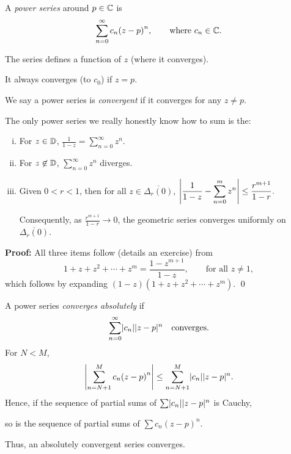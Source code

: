 \documentclass[10pt,aspectratio=169]{beamer}
\begin{document}
\begin{frame}
A \emph{power series} around $p \in {\mathbb{C}}$ is
\[
\sum_{n=0}^\infty c_n {(z-p)}^n ,
\qquad \text{where } c_n \in {\mathbb{C}}.
\]
\pause

The series defines a function of $z$ (where it converges).

\medskip
\pause

It always converges (to $c_0$) if $z=p$.

\medskip
\pause

We say a power series is \emph{convergent} if
it converges for any $z \not= p$.
\end{frame}

\begin{frame}
The only power series we really honestly know how to sum is the:

\begin{proposition}
\pause
\begin{enumerate}[(i)]
\item For $z \in {\mathbb{D}}$,
\quad
$\displaystyle
\frac{1}{1-z} = \sum_{n=0}^\infty z^n .
$
\pause
\item For $z \not\in {\mathbb{D}}$,
\quad
$\displaystyle
\sum_{n=0}^\infty z^n
$
diverges.
\pause
\item
Given $0 < r < 1$, then for all $z \in \overline{\Delta_r(0)}$,
\quad
$\displaystyle
\left\lvert {\frac{1}{1-z} - \sum_{n=0}^m z^n} \right\rvert
\leq \frac{r^{m+1}}{1-r} .
$
\pause

Consequently,
as $\frac{r^{m+1}}{1-r} \to 0$,
the geometric series converges uniformly
on $\overline{\Delta_r(0)}$.
\end{enumerate}
\end{proposition}

\pause
\textbf{Proof:}
All three items follow (details an exercise) from
\[
1+z+z^2+\cdots+z^m = \frac{1-z^{m+1}}{1-z} ,
\qquad \text{for all } z \not= 1,
\]
\pause
which follows by expanding $(1-z)(1+z+z^2+\cdots+z^m)$.
\qed
\end{frame}

\begin{frame}
A power series \emph{converges absolutely} if
\[
\sum_{n=0}^\infty \lvert {c_n} \rvert \lvert {z-p} \rvert^n \quad \text{converges.}
\]
\pause
For $N < M$,
\[
\left\lvert {\sum_{n=N+1}^M c_n {(z-p)}^n} \right\rvert
\leq
\sum_{n=N+1}^M \lvert {c_n} \rvert \lvert {z-p} \rvert^n .
\]
\pause
Hence,
if the sequence of partial sums of 
$\sum \lvert {c_n} \rvert \lvert {z-p} \rvert^n$ is Cauchy,

so is the sequence
of partial sums of $\sum c_n {(z-p)}^n$.

\medskip
\pause
Thus, an absolutely convergent series converges.
\end{frame}
\end{document}
